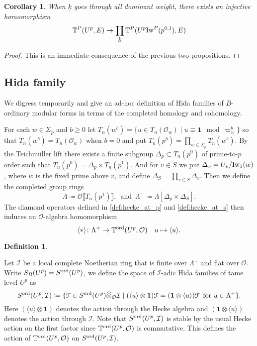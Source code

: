 \documentclass[leqno]{amsart}
\newtheorem{cor}[thm]{Corollary}
\theoremstyle{definition}
\newtheorem{defn}[thm]{Definition}
\theoremstyle{remark}
\newcommand{\id}{\mathbf{1}}
\newcommand{\oo}{\mathcal{O}}
\newcommand{\wt}[1]{\underline{ #1 }}
\newcommand{\Iw}{\textnormal{Iw}} %
\newcommand{\TT}{\mathbb{T}} %
\newcommand{\euF}{\EuScript{F}} %
\newcommand{\I}{\mathcal{I}} %
\newcommand{\ord}{\textnormal{ord}} %
\begin{document}
\begin{cor}\label{cor:density}
    When $\wt{k}$ goes through all dominant weight, 
    there exists an injective homomorphism
    \[
        \TT^P(U^p,E)\to \prod_{\wt{k}}\TT^P(U^p\Iw^P(p^{0,1}),E)
    \]
\end{cor}
\begin{proof}
This is an immediate consequence of the previous two propositions.
\end{proof}




\subsection{Hida family}

We digress temporarily 
and give an ad-hoc definition
of Hida families of $B$-ordinary modular forms
in terms of the completed homology and cohomology.

For each $w\in \Sigma_p$ and $b\geq 0$
let $T_n(w^b)=\{u\in T_n(\oo_w)\mid u\equiv \id \mod\varpi_w^b\}$
so that $T_n(w^b)=T_n(\oo_w)$ when $b=0$
and put $T_n(p^b)=\prod_{w\in\Sigma_p}T_n(w^b)$.
By the Teichm\"{u}ller lift
there exists a finite subgroup $\Delta_p\subset T_n(p^0)$
of prime-to-$p$ order such that 
$T_n(p^0)=\Delta_p\times T_n(p^1)$.
And for $v\in S$ 
we put $\Delta_v=U_v/\Iw_1(w)$,
where $w$ is the fixed prime above $v$,
and define $\Delta_S=\prod_{v\in S}\Delta_v$.
Then we define the completed group rings
\begin{equation}\label{def:lambda_rings}
    \Lambda\coloneqq \oo\llbracket T_n(p^1)\rrbracket,\,
    \text{ and }\,
    \Lambda^+\coloneqq \Lambda[\Delta_p\times \Delta_S].
\end{equation}
The diamond operators 
defined in \eqref{def:hecke_at_p} and \eqref{def:hecke_at_s}
then induces an $\oo$-algebra homomorphism
\begin{equation}\label{eq:Lambda_hecke}
    \langle *\rangle\colon \Lambda^+\to 
    \TT^{\ord}(U^p, \oo)\quad
    u\mapsto \langle u\rangle.
\end{equation}




\begin{defn}\label{def:Hida_family}

Let $\I$ be a local complete Noetherian ring
that is finite over $\Lambda^+$ and flat over $\oo$.
Write $S_B(U^p)=S^{\ord}(U^p)$, we define
the space of $\I$-adic Hida families 
of tame level $U^p$ as 
\begin{equation}\label{eq:Hida_family}
    S^{\ord}(U^p,\I)\coloneqq 
    \{\euF\in S^{\ord}(U^p)\widehat{\otimes}_\oo\I\mid 
    (\langle u\rangle\otimes\id)\euF=
    (\id\otimes\langle u\rangle)\euF\, \text{ for }
    u\in \Lambda^+\}.
\end{equation}
Here $(\langle u\rangle\otimes\id)$ denotes
the action through the Hecke algebra and
$(\id\otimes\langle u\rangle)$ denotes the action
through $\I$.
Note that $S^{\ord}(U^p,\I)$
is stable by the usual Hecke action on 
the first factor since $\TT^{\ord}(U^p,\oo)$ is commutative.
This defines the action of $\TT^{\ord}(U^p,\oo)$ on $S^{\ord}(U^p,\I)$.
\end{defn}
\end{document}
